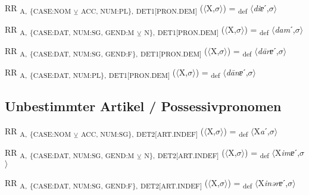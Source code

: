 {\begin{exe}
 RR \textsubscript{A,} \textsubscript{\{CASE:NOM} \textsubscript{${\veebar}$}\textsubscript{ ACC, NUM:PL\},} \textsubscript{DET1[PRON.DEM]} ($\langle$X,$\sigma $$\rangle$) = \textsubscript{def} $\langle$\textit{diɐ}ˊ,$\sigma $$\rangle$
\end{exe}

\begin{exe}
 RR \textsubscript{A,} \textsubscript{\{CASE:DAT, NUM:SG, GEND:M} \textsubscript{${\veebar}$}\textsubscript{ N\},} \textsubscript{DET1[PRON.DEM]} ($\langle$X,$\sigma $$\rangle$) = \textsubscript{def} $\langle$\textit{dam}ˊ,$\sigma $$\rangle$
\end{exe}

\begin{exe}
 RR \textsubscript{A,} \textsubscript{\{CASE:DAT, NUM:SG, GEND:F\},} \textsubscript{DET1[PRON.DEM]} ($\langle$X,$\sigma $$\rangle$) = \textsubscript{def} $\langle$\textit{d\=arɐ}ˊ,$\sigma $$\rangle$
\end{exe}

\begin{exe}
 RR \textsubscript{A,} \textsubscript{\{CASE:DAT, NUM:PL\},} \textsubscript{DET1[PRON.DEM]} ($\langle$X,$\sigma $$\rangle$) = \textsubscript{def} $\langle$\textit{d\=anɐ}ˊ,$\sigma $$\rangle$
\end{exe}

\subsection{Unbestimmter Artikel / Possessivpronomen}

\begin{exe}
 RR \textsubscript{A,} \textsubscript{\{CASE:NOM} \textsubscript{${\veebar}$}\textsubscript{ ACC, NUM:SG\},} \textsubscript{DET2[ART.INDEF]} ($\langle$X,$\sigma $$\rangle$) = \textsubscript{def} $\langle$X\textit{a}ˊ,$\sigma $$\rangle$
\end{exe}

\begin{exe}
 RR \textsubscript{A,} \textsubscript{\{CASE:DAT, NUM:SG, GEND:M} \textsubscript{${\veebar}$}\textsubscript{ N\},} \textsubscript{DET2[ART.INDEF]} ($\langle$X,$\sigma $$\rangle$) = \textsubscript{def} $\langle$X\textit{imɐ}ˊ,$\sigma $$\rangle$
\end{exe}

\begin{exe}
 RR \textsubscript{A,} \textsubscript{\{CASE:DAT, NUM:SG, GEND:F\},} \textsubscript{DET2[ART.INDEF]} ($\langle$X,$\sigma $$\rangle$) = \textsubscript{def} $\langle$X\textit{inərɐ}ˊ,$\sigma $$\rangle$
\end{exe}

}
